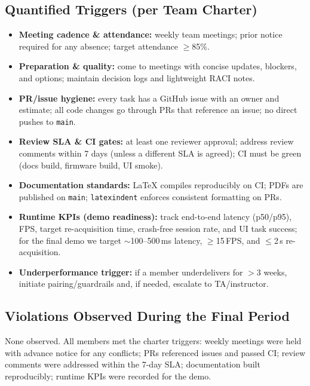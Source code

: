 \documentclass{article}
\begin{document}
\subsection*{Quantified Triggers (per Team Charter)}
\begin{itemize}
  \item \textbf{Meeting cadence \& attendance:} weekly team meetings; prior notice required for any absence; target attendance $\geq$85\%.
  \item \textbf{Preparation \& quality:} come to meetings with concise updates, blockers, and options; maintain decision logs and lightweight RACI notes.
  \item \textbf{PR/issue hygiene:} every task has a GitHub issue with an owner and estimate; all code changes go through PRs that reference an issue; no direct pushes to \texttt{main}.
  \item \textbf{Review SLA \& CI gates:} at least one reviewer approval; address review comments within 7 days (unless a different SLA is agreed); CI must be green (docs build, firmware build, UI smoke).
  \item \textbf{Documentation standards:} LaTeX compiles reproducibly on CI; PDFs are published on \texttt{main}; \texttt{latexindent} enforces consistent formatting on PRs.
  \item \textbf{Runtime KPIs (demo readiness):} track end-to-end latency (p50/p95), FPS, target re-acquisition time, crash-free session rate, and UI task success; for the final demo we target $\sim$100--500\,ms latency, $\geq$15\,FPS, and $\leq$2\,s re-acquisition.
  \item \textbf{Underperformance trigger:} if a member underdelivers for $>$3 weeks, initiate pairing/guardrails and, if needed, escalate to TA/instructor.
\end{itemize}

\subsection*{Violations Observed During the Final Period}
None observed. All members met the charter triggers: weekly meetings were held
with advance notice for any conflicts; PRs referenced issues and passed CI;
review comments were addressed within the 7-day SLA; documentation built
reproducibly; runtime KPIs were recorded for the demo.
\end{document}
